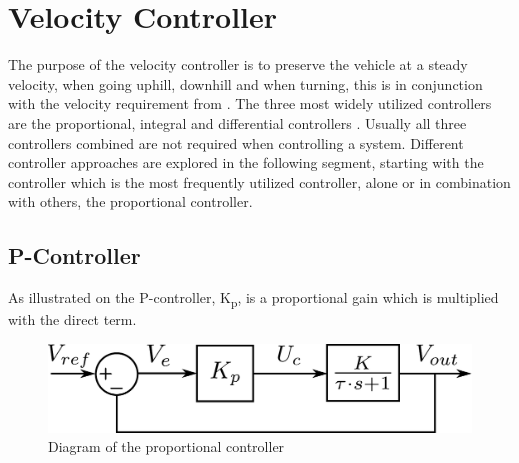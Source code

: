 \section{Velocity Controller}\label{sec:velocityController}
The purpose of the velocity controller is to preserve the vehicle at a steady velocity, when going uphill, downhill and when turning, this is in conjunction with the velocity requirement from . The three most widely utilized controllers are the proportional, integral and differential controllers . Usually all three controllers combined are not required when controlling a system. Different controller approaches are explored in the following segment, starting with the controller which is the most frequently utilized controller, alone or in combination with others, the proportional controller.

\subsection{P-Controller}
As illustrated on  the P-controller, \si{K_p}, is a proportional gain which is multiplied with the direct term.
%
\begin{figure}[H]
 	\centering
 	\includegraphics[scale=0.6]{figures/proportionalController.pdf}
 	\caption{Diagram of the proportional controller}
  \label{proportionalController}
\end{figure}

